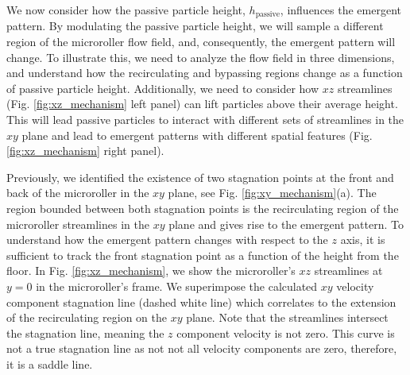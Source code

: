 \documentclass[12pt]{article}
\begin{document}

We now consider how the passive particle height, $h_\mathrm{passive}$, influences the emergent pattern. By modulating the passive particle height, we will sample a different region of the microroller flow field, and, consequently, the emergent pattern will change. To illustrate this, we need to analyze the flow field in three dimensions, and understand how the recirculating and bypassing regions change as a function of passive particle height. Additionally, we need to consider how $xz$ streamlines (Fig. \ref{fig:xz_mechanism} left panel) can lift particles above their average height. This will lead passive particles to interact with different sets of streamlines in the $xy$ plane and lead to emergent patterns with different spatial features (Fig. \ref{fig:xz_mechanism} right panel).  


Previously, we identified the existence of two stagnation points at the front and back of the microroller in the $xy$ plane, see Fig. \ref{fig:xy_mechanism}(a). The region bounded between both stagnation points is the recirculating region of the microroller streamlines in the $xy$ plane and gives rise to the emergent pattern. To understand how the emergent pattern changes with respect to the $z$ axis, it is sufficient to track the front stagnation point as a function of the height from the floor. In Fig. \ref{fig:xz_mechanism}, we show the microroller's $xz$ streamlines at $y = 0$ in the microroller's frame. We superimpose the calculated $xy$ velocity component stagnation line (dashed white line) which correlates to the extension of the recirculating region on the $xy$ plane. Note that the streamlines intersect the stagnation line, meaning the $z$ component velocity is not zero. This curve is not a true stagnation line as not not all velocity components are zero, therefore, it is a saddle line. 
\end{document}
